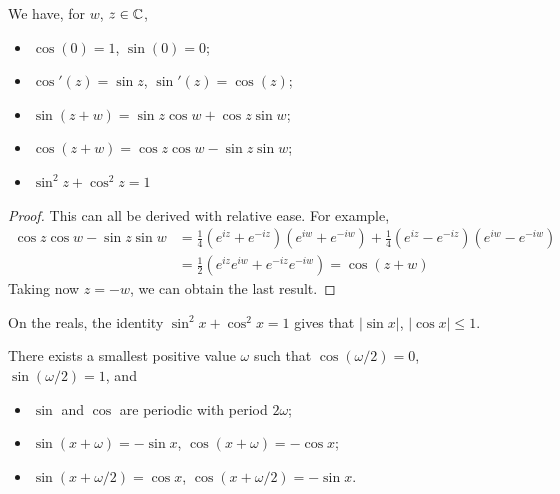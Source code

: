 \documentclass{../template/note}
\begin{document}
    \begin{lemma}
        We have, for \(w\), \(z \in \mathbb C\),
        \begin{itemize}
            \item \(\cos(0) = 1\), \(\sin(0) = 0\);
            \item \(\cos'(z) = \sin z\), \(\sin'(z) = \cos(z)\);
            \item \(\sin(z+w) = \sin z \cos w + \cos z \sin w\);
            \item \(\cos(z+w) = \cos z \cos w - \sin z \sin w\);
            \item \(\sin^2 z + \cos^2 z = 1\)
        \end{itemize}
    \end{lemma}
    
    \begin{proof}
        This can all be derived with relative ease. For example,
        \begin{align*}
            \cos z \cos w - \sin z \sin w &= \frac 1 4 \left(e^{iz}+e^{-iz}\right)\left(e^{iw}+e^{-iw}\right) + \frac 1 4 \left(e^{iz}-e^{-iz}\right)\left(e^{iw}-e^{-iw}\right) \\
            &= \frac{1}{2} \left(e^{iz}e^{iw}+e^{-iz}e^{-iw}\right) = \cos(z+w)
        \end{align*}
        Taking now \(z=-w\), we can obtain the last result.
    \end{proof}
    
    On the reals, the identity \(\sin^2 x + \cos^2 x = 1\) gives that \(|\sin x|\), \(|\cos x| \leq 1\).

    \begin{proposition}
        There exists a smallest positive value \(\omega\) such that \(\cos(\omega/2) = 0\), \(\sin(\omega/2)=1\), and
        \begin{itemize}
            \item \(\sin\) and \(\cos\) are periodic with period \(2\omega\);
            \item \(\sin(x+\omega) = -\sin x\), \(\cos(x+\omega)=-\cos x\);
            \item \(\sin(x+\omega/2) = \cos x\), \(\cos(x+\omega/2)=-\sin x\).
        \end{itemize}
    \end{proposition}
    
\end{document}
